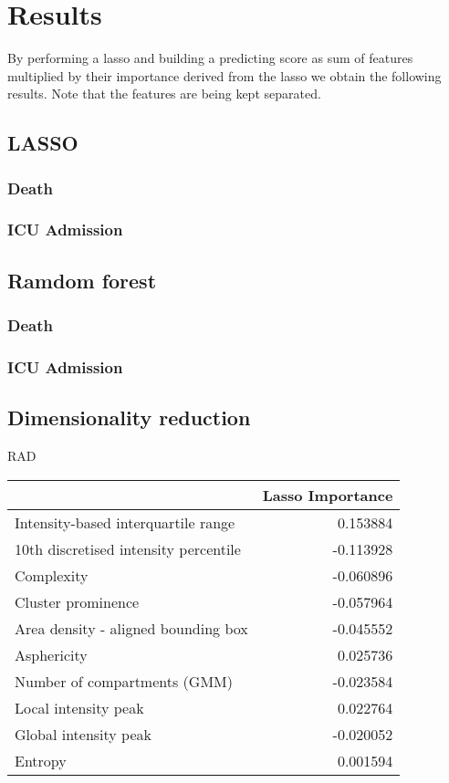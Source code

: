 \chapter{Results}
By performing a lasso and building a predicting score as sum of features multiplied by their importance derived from the lasso we obtain the following results. Note that the features are being kept separated. 

\section{LASSO}

\subsection{Death}

\subsection{ICU Admission}

\section{Ramdom forest}

\subsection{Death}

\subsection{ICU Admission}

\section{Dimensionality reduction}



RAD
\begin{tabular}{lr}
\toprule
{} &  Lasso Importance \\
\midrule
Intensity-based interquartile range   &          0.153884 \\
10th discretised intensity percentile &         -0.113928 \\
Complexity                            &         -0.060896 \\
Cluster prominence                    &         -0.057964 \\
Area density - aligned bounding box   &         -0.045552 \\
Asphericity                           &          0.025736 \\
Number of compartments (GMM)          &         -0.023584 \\
Local intensity peak                  &          0.022764 \\
Global intensity peak                 &         -0.020052 \\
Entropy                               &          0.001594 \\
\bottomrule
\end{tabular}


